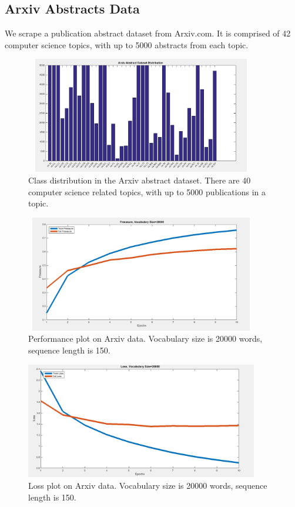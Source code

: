 \documentclass[12pt]{article}
\begin{document}
\subsection{Arxiv Abstracts Data}
We scrape a publication abstract dataset from Arxiv.com. It is comprised of 42 computer science topics, with up to 5000 abstracts from
each topic.

\begin{figure}[H]
\centering
\includegraphics[height=2in, width=4in]{Images/arxiv_distribution.png}
\caption{Class distribution in the Arxiv abstract dataset. There are 40 computer science related topics, with up to 5000 publications in a topic.}
\end{figure}

\begin{figure}[H]
\centering
\includegraphics[height=2in, width=4in]{Images/fmeasure_arxiv_20000_150.png}
\caption{Performance plot on Arxiv data. Vocabulary size is 20000 words, sequence length is 150.}
\end{figure}

\begin{figure}[H]
\centering
\includegraphics[height=2in, width=4in]{Images/loss_arxiv_20000_150.png}
\caption{Loss plot on Arxiv data. Vocabulary size is 20000 words, sequence length is 150.}
\end{figure}
\end{document}
